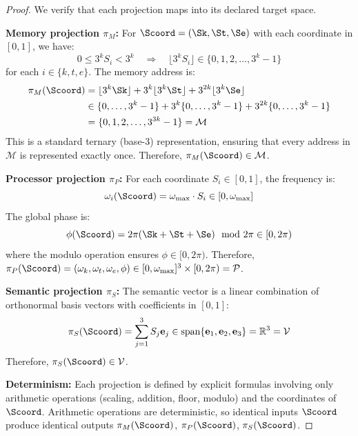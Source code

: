 \begin{proof}
We verify that each projection maps into its declared target space.

\textbf{Memory projection $\pi_M$:} For $\Scoord = (\Sk, \St, \Se)$ with each coordinate in $[0,1]$, we have:
\begin{equation}
0 \leq 3^k S_i < 3^k \quad \Rightarrow \quad \lfloor 3^k S_i \rfloor \in \{0, 1, 2, \ldots, 3^k - 1\}
\end{equation}
for each $i \in \{k, t, e\}$. The memory address is:
\begin{align}
\pi_M(\Scoord) &= \lfloor 3^k \Sk \rfloor + 3^k \lfloor 3^k \St \rfloor + 3^{2k} \lfloor 3^k \Se \rfloor \\
&\in \{0, \ldots, 3^k-1\} + 3^k \{0, \ldots, 3^k-1\} + 3^{2k} \{0, \ldots, 3^k-1\} \\
&= \{0, 1, 2, \ldots, 3^{3k} - 1\} = \mathcal{M}
\end{align}
This is a standard ternary (base-3) representation, ensuring that every address in $\mathcal{M}$ is represented exactly once. Therefore, $\pi_M(\Scoord) \in \mathcal{M}$.

\textbf{Processor projection $\pi_P$:} For each coordinate $S_i \in [0,1]$, the frequency is:
\begin{equation}
\omega_i(\Scoord) = \omega_{\max} \cdot S_i \in [0, \omega_{\max}]
\end{equation}
The global phase is:
\begin{equation}
\phi(\Scoord) = 2\pi(\Sk + \St + \Se) \mod 2\pi \in [0, 2\pi)
\end{equation}
where the modulo operation ensures $\phi \in [0, 2\pi)$. Therefore, $\pi_P(\Scoord) = (\omega_k, \omega_t, \omega_e, \phi) \in [0,\omega_{\max}]^3 \times [0, 2\pi) = \mathcal{P}$.

\textbf{Semantic projection $\pi_S$:} The semantic vector is a linear combination of orthonormal basis vectors with coefficients in $[0,1]$:
\begin{equation}
\pi_S(\Scoord) = \sum_{j=1}^3 S_j \mathbf{e}_j \in \text{span}\{\mathbf{e}_1, \mathbf{e}_2, \mathbf{e}_3\} = \mathbb{R}^3 = \mathcal{V}
\end{equation}
Therefore, $\pi_S(\Scoord) \in \mathcal{V}$.

\textbf{Determinism:} Each projection is defined by explicit formulas involving only arithmetic operations (scaling, addition, floor, modulo) and the coordinates of $\Scoord$. Arithmetic operations are deterministic, so identical inputs $\Scoord$ produce identical outputs $\pi_M(\Scoord)$, $\pi_P(\Scoord)$, $\pi_S(\Scoord)$.
\end{proof}

